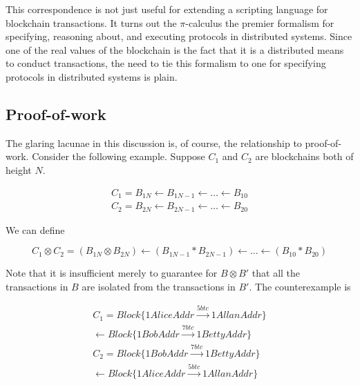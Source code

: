 \documentclass[fleqn]{acm_proc_article-sp}
\numberwithin{equation}{subsection}
\begin{document}
This correspondence is not just useful for extending a scripting
language for blockchain transactions. It turns out the
{$\pi$}-calculus the premier formalism for specifying, reasoning
about, and executing protocols in distributed systems. Since one of
the real values of the blockchain is the fact that it is a distributed
means to conduct transactions, the need to tie this formalism to one
for specifying protocols in distributed systems is plain.

\subsection{Proof-of-work}

The glaring lacunae in this discussion is, of course, the relationship
to proof-of-work. Consider the following example. Suppose $C_1$ and $C_2$
are blockchains both of height $N$.

\begin{equation*}
  \begin{aligned}
    C_1 = B_{1N} \leftarrow B_{1N-1} \leftarrow \ldots \leftarrow B_{10} \\
    C_2 = B_{2N} \leftarrow B_{2N-1} \leftarrow \ldots \leftarrow B_{20}
  \end{aligned}
\end{equation*}

We can define

\begin{equation*}
  C_1 \otimes C_2 = ( B_{1N} \otimes B_{2N} ) \leftarrow ( B_{1N-1} * B_{2N-1} ) \leftarrow \ldots \leftarrow ( B_{10} * B_{20} )
\end{equation*}

Note that it is insufficient merely to guarantee for $B \otimes B'$ that all
the transactions in $B$ are isolated from the transactions in $B'$. The
counterexample is

\begin{equation*}
  \begin{aligned}
    C_1 = Block\{ 1AliceAddr \xrightarrow{5btc} 1AllanAddr \} \\
    \leftarrow Block\{ 1BobAddr \xrightarrow{7btc} 1BettyAddr \} \\
    C_2 = Block\{ 1BobAddr \xrightarrow{7btc} 1BettyAddr \} \\
    \leftarrow Block\{ 1AliceAddr \xrightarrow{5btc} 1AllanAddr \}
  \end{aligned}
\end{equation*}
\end{document}

